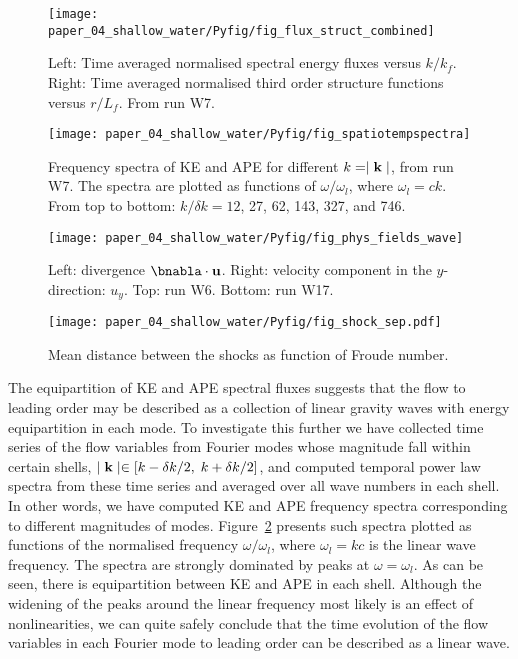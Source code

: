 \begin{figure}
\centerline{\texttt{[image: paper\_04\_shallow\_water/Pyfig/fig\_flux\_struct\_combined]}}
\caption{Left: Time averaged normalised spectral energy fluxes versus $ k/k_f
$. Right: Time averaged normalised third order structure functions versus $
r/L_f $. From run W7. }
\label{Flux}
\end{figure}


\begin{figure}
\centerline{\texttt{[image: paper\_04\_shallow\_water/Pyfig/fig\_spatiotempspectra]}}
\caption{Frequency spectra of KE and APE for different $ k = \mid {\bf k} \mid
$, from run W7. The spectra are plotted as functions of $\omega/\omega_l$,
where $\omega_l = c k$. From top to bottom: $ k /\delta k = 12$, 27, 62, 143,
327, and 746. }
\label{fig_spatiotemp_spectra}
\end{figure}

\begin{figure}
\centerline{\texttt{[image: paper\_04\_shallow\_water/Pyfig/fig\_phys\_fields\_wave]}}
\caption{Left: divergence $ \bnabla \cdot {\bf u} $. Right: velocity component in the $ y $-direction: $ u_y $. Top: run W6. Bottom: run W17.  }
\label{Physical}
\end{figure}

\begin{figure}
\centerline{\texttt{[image: paper\_04\_shallow\_water/Pyfig/fig\_shock\_sep.pdf]}}
\caption{Mean distance between the shocks as function of Froude number.  }
\label{fig_distance}
\end{figure}




The equipartition of KE and APE spectral fluxes suggests that the flow to
leading order may be described as a collection of linear gravity waves with energy
equipartition in each mode. To investigate this further we have
collected time series of the flow variables from Fourier modes whose magnitude
fall within certain shells, $ \mid {\bf k} \mid \in [ k -\delta k/2, \; k+
\delta k/2] $, and computed temporal power law spectra from these time series
and averaged over all wave numbers in each shell. In other words, we have
computed KE and APE frequency spectra corresponding to different magnitudes of
modes. Figure~\ref{fig_spatiotemp_spectra} presents such spectra plotted as 
functions of the normalised frequency $\omega/\omega_l$, where $ \omega_l = kc
$ is the linear wave frequency. The spectra are strongly dominated by peaks at
$\omega = \omega_l$. As can be seen, there is equipartition between KE and APE
in each shell. Although the widening of the peaks around the linear frequency
most likely is an effect of nonlinearities, we can quite safely conclude that
the time evolution of the flow variables in each Fourier mode to leading order
can be described as a linear wave.

